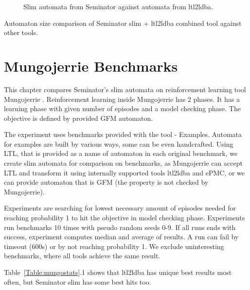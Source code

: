\documentclass[
	digital,
nolof, nolot
]{fithesis3}
\begin{document}
		\clearpage
		\begin{figure}[ht]
			\centering
			
			\caption{Slim automata from Seminator against automata from ltl2ldba.}
			\label{scatter:seminator-ltl2ldba}
		\begin{tikzpicture}
		
		\end{tikzpicture}
		\end{figure}
	
	\begin{table}[ht]
		\centering
		
		\caption{Automaton size comparison of Seminator slim + ltl2ldba combined tool against other tools.}
		\label{table:basic-tools-mix}
		
	\end{table}

	\chapter{Mungojerrie Benchmarks}
	This chapter compares Seminator's slim automata on reinforcement learning tool Mungojerrie \cite{mungojerrie}. Reinforcement learning inside Mungojerrie has 2 phases. It has a learning phase with given number of episodes and a model checking phase. The objective is defined by provided GFM automaton.\cite{mungojerrie}
	
	
	The experiment uses benchmarks provided with the tool - Examples. Automata for examples are built by various ways, some can be even handcrafted. Using LTL, that is provided as a name of automaton in each original benchmark, we create slim automata for comparison on benchmarks, as Mungojerrie can accept LTL and transform it using internally supported tools ltl2ldba and ePMC, or we can provide automaton that is GFM (the property is not checked by Mungojerrie).
	
	
	Experiments are searching for lowest necessary amount of episodes needed for reaching probability 1 to hit the objective in model checking phase. Experiments run benchmarks 10 times with pseudo random seeds 0-9. If all runs ends with success, experiment computes median and average of results. A run can fail by timeout (600s) or by not reaching probability 1. We exclude uninteresting benchmarks, where all tools achieve the same result. 
	
	Table~\ref{Table:mungostats}.1 shows that ltl2ldba has unique best results most often, but Seminator slim has some best hits too.
	
\end{document}
